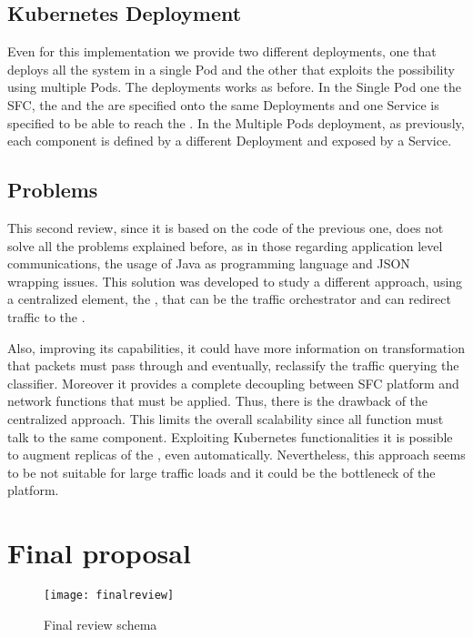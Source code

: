 \subsection{Kubernetes Deployment}
Even for this implementation we provide two different deployments, one that
deploys all the system in a single Pod and the other that exploits the
possibility using multiple Pods. The deployments works as before. In the Single
Pod one the SFC, the \enchainer{} and the \dispatcher{} are specified onto the
same Deployments and one Service is specified to be able to reach the
\enchainer{}. In the Multiple Pods deployment, as previously, each component is
defined by a different Deployment and exposed by a Service.

\subsection{Problems}
This second review, since it is based on the code of the previous one, does not
solve all the problems explained before, as in those regarding application
level communications, the usage of Java as programming language and JSON
wrapping issues. This solution was developed to study a different
approach, using a centralized element, the \dispatcher{}, that can be the
traffic orchestrator and can redirect traffic to the \vnfs{}. 



Also, improving
its capabilities, it could have more information on transformation that packets
must pass through and eventually, reclassify the traffic querying the
classifier. Moreover it provides a complete decoupling between SFC platform and
network functions that must be applied. Thus, there is the drawback of the
centralized approach. This limits the overall scalability since all function
must talk to the same component. Exploiting Kubernetes functionalities it is
possible to augment replicas of the \dispatcher{}, even automatically.
Nevertheless, this approach seems to be not suitable for large traffic loads
and it could be the bottleneck of the platform.

\section{Final proposal}

\begin{figure}
  \centering
  \texttt{[image: finalreview]}
  \caption{Final review schema}
  \label{chap:impl:img:finalreview}
\end{figure}

